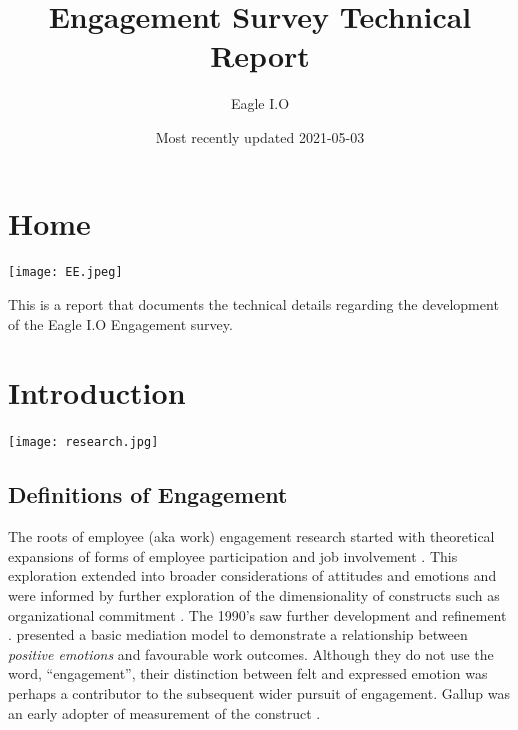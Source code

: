 \documentclass[
]{book}
\title{Engagement Survey Technical Report}
\author{Eagle I.O}
\date{Most recently updated 2021-05-03}
\begin{document}
\maketitle

{
\setcounter{tocdepth}{4}
\tableofcontents
}
\hypertarget{homepage}{%
\chapter{Home}\label{homepage}}

\texttt{[image: EE.jpeg]}

This is a report that documents the technical details regarding the development of the Eagle I.O Engagement survey.

\hypertarget{intro}{%
\chapter{Introduction}\label{intro}}

\texttt{[image: research.jpg]}

\hypertarget{definitions-of-engagement}{%
\section{Definitions of Engagement}\label{definitions-of-engagement}}

The roots of employee (aka work) engagement research started with theoretical expansions of forms of employee participation \citep[see, for example,][]{ferris_added_1984} and job involvement \citep[e.g.,][]{elloy_examination_1991}. This exploration extended into broader considerations of attitudes and emotions \citep{staw_employee_1994} and were informed by further exploration of the dimensionality of constructs such as organizational commitment \citep{meyer_three-component_1991}. The 1990's saw further development and refinement \citep[for example, a dissertation;][]{leone_relation_1995}. \citet{staw_employee_1994} presented a basic mediation model to demonstrate a relationship between \emph{positive emotions} and favourable work outcomes. Although they do not use the word, ``engagement'', their distinction between felt and expressed emotion was perhaps a contributor to the subsequent wider pursuit of engagement. Gallup was an early adopter of measurement of the construct \citep[see, for example,][]{coffman_hard_1999}.
\end{document}

